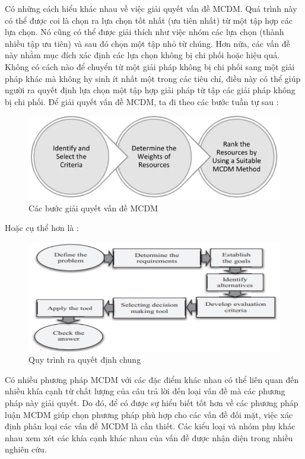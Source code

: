 Có những cách hiểu khác nhau về việc giải quyết vấn đề MCDM. Quá trình này có thể được coi là chọn ra lựa chọn tốt nhất (ưu tiên nhất) từ một tập hợp các lựa chọn. Nó cũng có thể được giải thích như việc nhóm các lựa chọn (thành nhiều tập ưu tiên) và sau đó chọn một tập nhỏ từ chúng. Hơn nữa, các vấn đề này nhằm mục đích xác định các lựa chọn không bị chi phối hoặc hiệu quả. Không có cách nào để chuyển từ một giải pháp không bị chi phối sang một giải pháp khác mà không hy sinh ít nhất một trong các tiêu chí, điều này có thể giúp người ra quyết định lựa chọn một tập hợp giải pháp từ tập các giải pháp không bị chi phối. Để giải quyết vấn đề MCDM, ta đi theo các bước tuần tự sau : 
\begin{figure}[H]
    \centering
    \includegraphics[width=0.8\linewidth, height=0.25\textheight]{images/MCDMstep.png}
    \caption{Các bước giải quyết vấn đề MCDM}
\end{figure}
Hoặc cụ thể hơn là \cite{davood}:
\begin{figure}[H]
    \centering
    \includegraphics[width=0.8\linewidth, height=0.25\textheight]{images/MCDMdiagram.png}
    \caption{Quy trình ra quyết định chung}
    \vspace{0.6cm
    }
\end{figure}

Có nhiều phương pháp MCDM với các đặc điểm khác nhau có thể liên quan đến nhiều khía cạnh từ chất lượng của câu trả lời đến loại vấn đề mà các phương pháp này giải quyết. Do đó, để có được sự hiểu biết tốt hơn về các phương pháp luận MCDM giúp chọn phương pháp phù hợp cho các vấn đề đối mặt, việc xác định phân loại các vấn đề MCDM là cần thiết. Các kiểu loại và nhóm phụ khác nhau xem xét các khía cạnh khác nhau của vấn đề được nhận diện trong nhiều nghiên cứu. 

